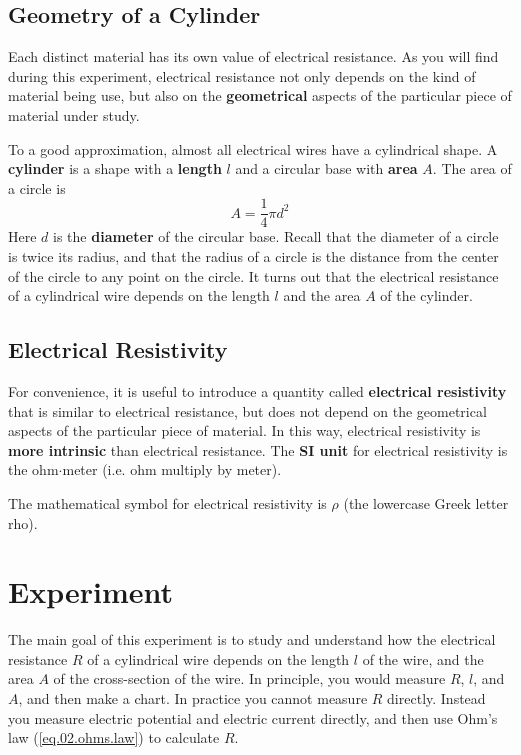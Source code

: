\subsection{Geometry of a Cylinder}
Each distinct material has its own value of electrical resistance. As you will find during this experiment, electrical resistance not only depends on the kind of material being use, but also on the \textbf{geometrical} aspects of the particular piece of material under study.

To a good approximation, almost all electrical wires have a cylindrical shape. A \textbf{cylinder} is a shape with a \textbf{length} $l$ and a circular base with \textbf{area} $A$. The area of a circle is
\begin{equation}
	A = \frac{1}{4} \pi d^{2}
	\label{eq.02.area}
\end{equation}
Here $d$ is the \textbf{diameter} of the circular base. Recall that the diameter of a circle is twice its radius, and that the radius of a circle is the distance from the center of the circle to any point on the circle. It turns out that the electrical resistance of a cylindrical wire depends on the length $l$ and the area $A$ of the cylinder.
\subsection{Electrical Resistivity}
For convenience, it is useful to introduce a quantity called \textbf{electrical resistivity} that is similar to electrical resistance, but does not depend on the geometrical aspects of the particular piece of material. In this way, electrical resistivity is \textbf{more intrinsic} than electrical resistance. The \textbf{SI unit} for electrical resistivity is the ohm$\cdot$meter (i.e. ohm multiply by meter).

The mathematical symbol for electrical resistivity is $\rho$ (the lowercase Greek letter rho).
\section{Experiment}
The main goal of this experiment is to study and understand how the electrical resistance $R$ of a cylindrical wire depends on the length $l$ of the wire, and the area $A$ of the cross-section of the wire. In principle, you would measure $R$, $l$, and $A$, and then make a chart. In practice you cannot measure $R$ directly. Instead you measure electric potential and electric current directly, and then use Ohm's law (\ref{eq.02.ohms.law}) to calculate $R$.

